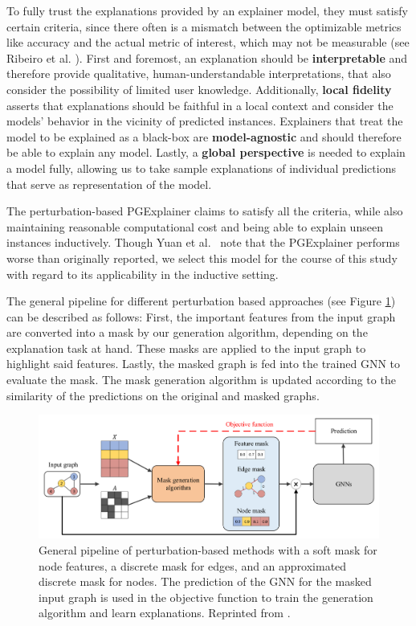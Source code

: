 To fully trust the explanations provided by an explainer model, they must satisfy certain criteria, since there often is a mismatch between the optimizable metrics like accuracy and the actual metric of interest, which may not be measurable (see Ribeiro et al. \cite{ribeiro2016should}). First and foremost, an explanation should be \textbf{interpretable} and therefore provide qualitative, human-understandable interpretations, that also consider the possibility of limited user knowledge. Additionally, \textbf{local fidelity} asserts that explanations should be faithful in a local context and consider the models' behavior in the vicinity of predicted instances. Explainers that treat the model to be explained as a black-box are \textbf{model-agnostic} and should therefore be able to explain any model. Lastly, a \textbf{global perspective} is needed to explain a model fully, allowing us to take sample explanations of individual predictions that serve as representation of the model. \bigskip

The perturbation-based PGExplainer \cite{luo2020parameterized} claims to satisfy all the criteria, while also maintaining reasonable computational cost and being able to explain unseen instances inductively. Though Yuan et al.~\cite{yuan2022explainability} note that the PGExplainer performs worse than originally reported, we select this model for the course of this study with regard to its applicability in the inductive setting.

The general pipeline for different perturbation based approaches (see Figure \ref{fig:perturbation_pipeline}) can be described as follows: First, the important features from the input graph are converted into a mask by our generation algorithm, depending on the explanation task at hand. These masks are applied to the input graph to highlight said features. Lastly, the masked graph is fed into the trained GNN to evaluate the mask. The mask generation algorithm is updated according to the similarity of the predictions on the original and masked graphs.  \bigskip

\begin{figure}
    \includegraphics[width=\textwidth]{img/perturbation_pipeline.png}
    \caption[General pipeline of perturbation-based explainability methods]{\small General pipeline of perturbation-based methods with a soft mask for node features, a discrete mask for edges, and an approximated discrete mask for nodes. The prediction of the GNN for the masked input graph is used in the objective function to train the generation algorithm and learn explanations. Reprinted from \cite{yuan2022explainability}.}
    \label{fig:perturbation_pipeline}
\end{figure}

